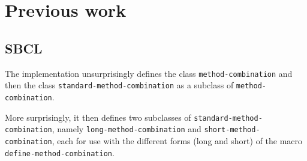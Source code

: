 \section{Previous work}

\subsection{SBCL}

The \sbcl{} \commonlisp{} implementation unsurprisingly defines the
class \texttt{method-combination} and then the class
\texttt{standard-method-combination} as a subclass of
\texttt{method-combination}.

More surprisingly, it then defines two subclasses of
\texttt{standard-method-combination}, namely
\texttt{long-method-combination} and
\texttt{short-method-combination}, each for use with the different
forms (long and short) of the macro
\texttt{define-method-combination}.
